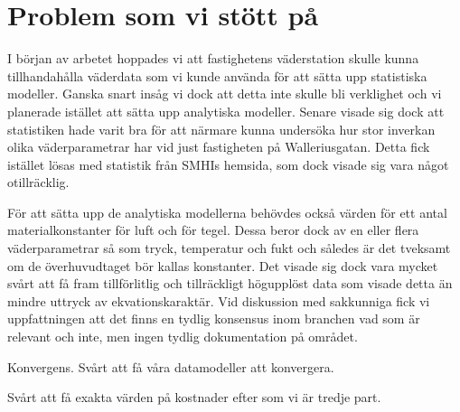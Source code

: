\section{Problem som vi stött på}

I början av arbetet hoppades vi att fastighetens väderstation skulle kunna tillhandahålla väderdata som vi kunde använda för att sätta upp statistiska modeller. 
Ganska snart insåg vi dock att detta inte skulle bli verklighet och vi planerade istället att sätta upp analytiska modeller. 
Senare visade sig dock att statistiken hade varit bra för att närmare kunna undersöka hur stor inverkan olika väderparametrar har vid just fastigheten på Walleriusgatan. 
Detta fick istället lösas med statistik från SMHIs hemsida, som dock visade sig vara något otillräcklig.

För att sätta upp de analytiska modellerna behövdes också värden för ett antal materialkonstanter för luft och för tegel. 
Dessa beror dock av en eller flera väderparametrar så som tryck, temperatur och fukt och således är det tveksamt om de överhuvudtaget bör kallas konstanter. 
Det visade sig dock vara mycket svårt att få fram tillförlitlig och tillräckligt högupplöst data som visade detta än mindre uttryck av ekvationskaraktär. 
Vid diskussion med sakkunniga fick vi uppfattningen att det finns en tydlig konsensus inom branchen vad som är relevant och inte, men ingen tydlig dokumentation på området.

Konvergens. Svårt att få våra datamodeller att konvergera. 

Svårt att få exakta värden på kostnader efter som vi är tredje part.
